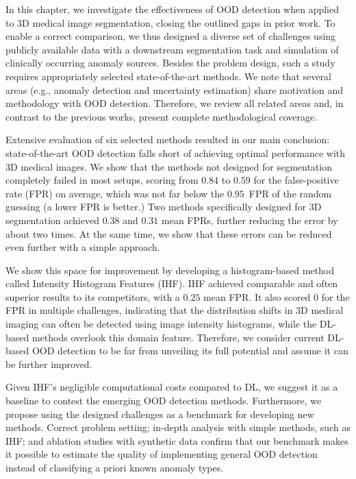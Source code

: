 In this chapter, we investigate the effectiveness of OOD detection when applied to 3D medical image segmentation, closing the outlined gaps in prior work. To enable a correct comparison, we thus designed a diverse set of challenges using publicly available data with a downstream segmentation task and simulation of clinically occurring anomaly sources. Besides the problem design, such a study requires appropriately selected state-of-the-art methods. We note that several areas (e.g., anomaly detection and uncertainty estimation) share motivation and methodology with OOD detection. Therefore, we review all related areas and, in contrast to the previous works, present complete methodological coverage.

Extensive evaluation of six selected methods resulted in our main conclusion: state-of-the-art OOD detection falls short of achieving optimal performance with 3D medical images. We show that the methods not designed for segmentation completely failed in most setups, scoring from $0.84$ to $0.59$ for the false-positive rate (FPR) on average, which was not far below the $0.95$~FPR of the random guessing (a lower FPR is better.) Two methods specifically designed for 3D segmentation achieved $0.38$ and $0.31$ mean FPRs, further reducing the error by about two times. At the same time, we show that these errors can be reduced even further with a simple approach.

We show this space for improvement by developing a histogram-based method called Intensity Histogram Features (IHF). IHF achieved comparable and often superior results to its competitors, with a $0.25$ mean FPR. It also scored $0$ for the FPR in multiple challenges, indicating that the distribution shifts in 3D medical imaging can often be detected using image intensity histograms, while the DL-based methods overlook this domain feature. Therefore, we consider current DL-based OOD detection to be far from unveiling its full potential and assume it can be further improved.

Given IHF's negligible computational costs compared to DL, we suggest it as a baseline to contest the emerging OOD detection methods. Furthermore, we propose using the designed challenges as a benchmark for developing new methods. Correct problem setting; in-depth analysis with simple methods, such as IHF; and ablation studies with synthetic data confirm that our benchmark makes it possible to estimate the quality of implementing general OOD detection instead of classifying a priori known anomaly types.%

